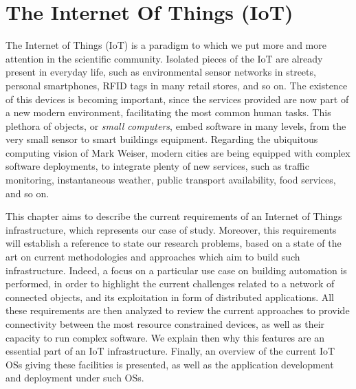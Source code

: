 \chapter{The Internet Of Things (IoT)}
\label{ch:IoT}

The Internet of Things (IoT) is a paradigm to which we put more and more attention in the scientific community\cite{atzori2010iotsurvey}.
Isolated pieces of the IoT are already present in everyday life, such as environmental sensor networks in streets, personal smartphones, RFID tags in many retail stores, and so on.
The existence of this devices is becoming important, since the services provided are now part of a new modern environment, facilitating the most common human tasks.
This plethora of objects, or \textit{small computers}, embed software in many levels, from the very small sensor to smart buildings equipment.
Regarding the ubiquitous computing vision of Mark Weiser\cite{weiser1999ubiquitous}, modern cities are being equipped with complex software deployments, to integrate plenty of new services, such as traffic monitoring, instantaneous weather, public transport availability, food services, and so on.

This chapter aims to describe the current requirements of an Internet of Things infrastructure, which represents our case of study.
Moreover, this requirements will establish a reference to state our research problems, based on a state of the art on current methodologies and approaches which aim to build such infrastructure.
Indeed, a focus on a particular use case on building automation is performed, in order to highlight the current challenges related to a network of connected objects, and its exploitation in form of distributed applications.
All these requirements are then analyzed to review the current approaches to provide connectivity between the most resource constrained devices, as well as their capacity to run complex software.
We explain then why this features are an essential part of an IoT infrastructure.
Finally, an overview of the current IoT OSs giving these facilities is presented, as well as the application development and deployment under such OSs.


